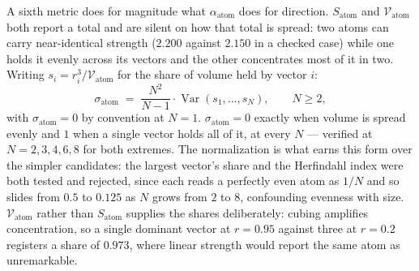 \documentclass[12pt, a4paper]{article}
\begin{document}
A sixth metric does for magnitude what $\alpha_{\text{atom}}$ does
for direction. $S_{\text{atom}}$ and $\mathcal{V}_{\text{atom}}$ both
report a total and are silent on how that total is spread: two atoms
can carry near-identical strength ($2.200$ against $2.150$ in a
checked case) while one holds it evenly across its vectors and the
other concentrates most of it in two. Writing $s_i = r_i^3 /
\mathcal{V}_{\text{atom}}$ for the share of volume held by vector
$i$:
\begin{equation}
    \sigma_{\text{atom}} \;=\;
    \frac{N^2}{N-1}\cdot\operatorname{Var}(s_1,\ldots,s_N),
    \qquad N\ge 2,
    \label{eq:volume_concentration}
\end{equation}
with $\sigma_{\text{atom}}=0$ by convention at $N=1$.
$\sigma_{\text{atom}}=0$ exactly when volume is spread evenly and $1$
when a single vector holds all of it, at every $N$ --- verified at
$N=2,3,4,6,8$ for both extremes. The normalization is what earns this
form over the simpler candidates: the largest vector's share and the
Herfindahl index were both tested and rejected, since each reads a
perfectly even atom as $1/N$ and so slides from $0.5$ to $0.125$ as
$N$ grows from $2$ to $8$, confounding evenness with size.
$\mathcal{V}_{\text{atom}}$ rather than $S_{\text{atom}}$ supplies
the shares deliberately: cubing amplifies concentration, so a single
dominant vector at $r=0.95$ against three at $r=0.2$ registers a
share of $0.973$, where linear strength would report the same atom
as unremarkable.
\end{document}
